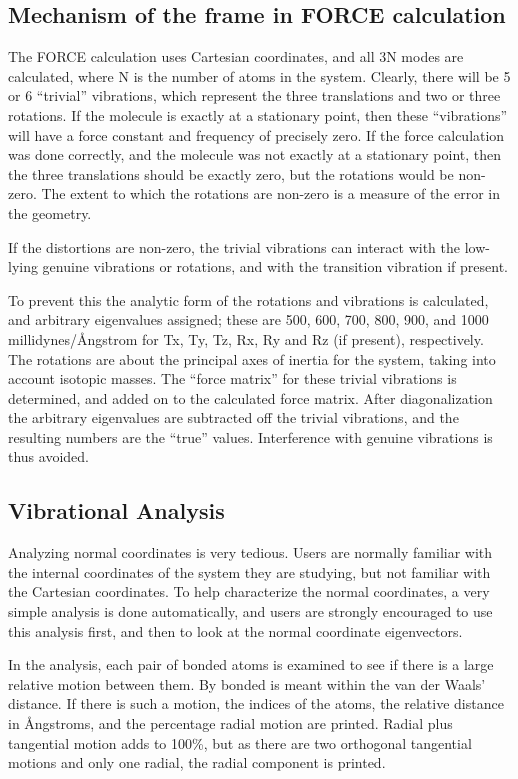 \subsection{Mechanism of the frame in FORCE calculation}
The FORCE calculation uses Cartesian coordinates, and all 3N  modes are
calculated, where N is the number of atoms in the system.  Clearly, there will
be 5 or 6 ``trivial'' vibrations,  which  represent  the  three translations
and two or three rotations.  If the molecule is exactly at a stationary point,
then these ``vibrations'' will have a  force  constant and  frequency  of
precisely  zero.   If the force calculation was done correctly, and the
molecule was not exactly at a stationary point,  then the  three  translations
should be exactly zero, but the rotations would be non-zero.  The extent to
which  the  rotations  are  non-zero  is  a measure of the error in the
geometry.

If  the  distortions  are  non-zero,  the  trivial  vibrations  can interact
with  the  low-lying genuine vibrations or rotations, and with the transition
vibration if present.

To prevent this the analytic form of the rotations  and  vibrations is
calculated,  and arbitrary eigenvalues assigned; these are 500, 600, 700, 800,
900, and 1000 millidynes/\AA ngstrom for Tx, Ty, Tz, Rx,  Ry  and Rz  (if
present),  respectively.  The rotations are about the principal axes of inertia
for the system, taking  into  account  isotopic  masses. The ``force matrix''
for these trivial vibrations is determined, and added on to the calculated
force matrix.  After diagonalization the  arbitrary eigenvalues are subtracted
off the trivial vibrations, and the resulting numbers are the ``true'' values.
Interference with genuine vibrations  is thus avoided.

\subsection{Vibrational Analysis}
Analyzing normal coordinates is very tedious.  Users  are  normally familiar
with the internal coordinates of the system they are studying, but not familiar
with the Cartesian coordinates.  To  help characterize the  normal
coordinates,  a very simple analysis is done automatically, and users are
strongly encouraged to use this analysis first,  and  then to look at the
normal coordinate eigenvectors.

In the analysis, each pair of bonded atoms is examined  to  see  if there  is
a  large  relative  motion  between them.  By bonded is meant  within the van der Waals' distance.  If there  is  such  a  motion,
the indices  of  the  atoms,  the  relative  distance  in \AA ngstroms, and the
percentage radial motion are printed.   Radial  plus  tangential  motion adds
to  100\%,  but  as there are two orthogonal tangential motions and only one
radial, the radial component is printed.

